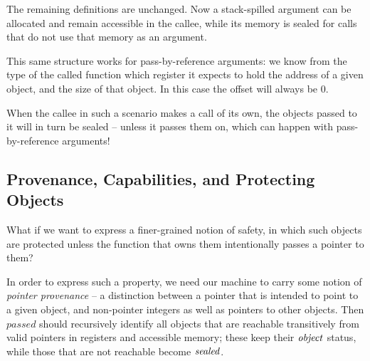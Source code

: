 \documentclass[10pt,conference]{ieeetran}%
\theoremstyle{definition}
\begin{document}
The remaining definitions are unchanged. Now a stack-spilled argument can be allocated
and remain accessible in the callee, while its memory is sealed for calls that do not
use that memory as an argument.

This same structure works for pass-by-reference arguments: we know from the type of
the called function which register it expects to hold the address of a given object,
and the size of that object. In this case the offset will always be 0.

When the callee in such a scenario makes a call of its own, the objects passed to it
will in turn be sealed -- unless it passes them on, which can happen with pass-by-reference
arguments!

\subsection{Provenance, Capabilities, and Protecting Objects}

What if we want to express a finer-grained notion of safety, in which
such objects are protected unless the function that owns them intentionally
passes a pointer to them?

In order to express such a property, we need our machine to carry some notion
of {\it pointer provenance} -- a distinction between a pointer that is intended to
point to a given object, and non-pointer integers as well as pointers to other objects.
Then \(\mathit{passed}\) should recursively identify all objects that
are reachable transitively from valid pointers in registers and accessible memory;
these keep their \(\mathit{object}\) status, while those that are not reachable become \(\mathit{sealed}\).
         


\end{document}

